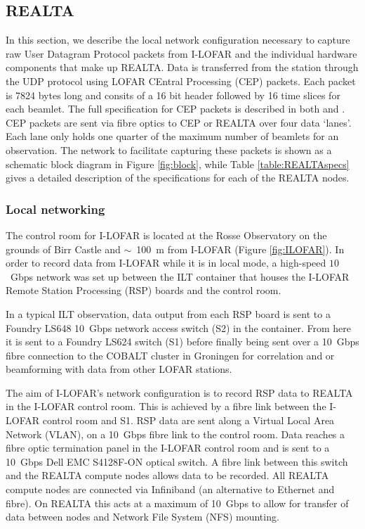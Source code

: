 \subsection{REALTA}
\label{sec:REALTA}
In this section, we describe the local network configuration necessary to capture raw User Datagram Protocol \citep[UDP;][]{Postel} packets from I-LOFAR and the individual hardware components that make up REALTA. Data is transferred from the station through the UDP protocol using LOFAR CEntral Processing (CEP) packets. Each packet is 7824 bytes long and consits of a 16 bit header followed by 16 time slices for each beamlet. The full specification for CEP packets is described in both \cite{Lubberhuizen2009} and \citet{Virtanen2018}.  CEP packets are sent via fibre optics to CEP or REALTA over four data `lanes'. Each lane only holds one quarter of the maximum number of beamlets for an observation.
The network to facilitate capturing these packets is shown as a schematic block diagram in Figure \ref{fig:block}, while Table \ref{table:REALTAspecs} gives a detailed description of the specifications for each of the REALTA nodes. 

\subsubsection{Local networking}
\label{sec:network}
The control room for I-LOFAR is located at the Rosse Observatory on the grounds of Birr Castle and $\sim$~100~m from I-LOFAR (Figure \ref{fig:ILOFAR}). In order to record data from I-LOFAR while it is in local mode, a high-speed $10$~Gbps network was set up between the ILT container that houses the I-LOFAR Remote Station Processing (RSP) boards and the control room.

In a typical ILT observation, data output from each RSP board is sent to a Foundry LS648 10~Gbps network access switch (S2) in the container. From here it is sent to a Foundry LS624 switch (S1) before finally being sent over a 10~Gbps fibre connection to the COBALT cluster in Groningen for correlation and or beamforming with data from other LOFAR stations.

The aim of I-LOFAR's network configuration is to record RSP data to REALTA in the I-LOFAR control room. This is achieved by a fibre link between the I-LOFAR control room and S1. RSP data are sent along a Virtual Local Area Network (VLAN), on a 10~Gbps fibre link to the control room. Data reaches a fibre optic termination panel in the I-LOFAR control room and is sent to a 10~Gbps Dell EMC S4128F-ON optical switch. A fibre link between this switch and the REALTA compute nodes allows data to be recorded. All REALTA compute nodes are connected via Infiniband (an alternative to Ethernet and fibre). On REALTA this acts at a maximum of 10~Gbps to allow for transfer of data between nodes and Network File System (NFS) mounting.


